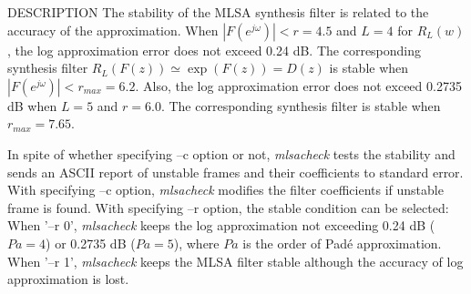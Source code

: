 \begin{qsection}{DESCRIPTION}
 The stability of the MLSA synthesis filter
 is related to the accuracy of the approximation.
 When \begin{math} |F(e^{j\omega})| < r = 4.5 \end{math} and
 \begin{math} L = 4 \end{math}
 for \begin{math} R_{L}(w)\end{math},
 the log approximation error does not exceed 0.24 dB.
 The corresponding synthesis filter
 \begin{math} R_{L}(F(z))\simeq \exp(F(z))=D(z)\end{math}
 is stable when \begin{math} |F(e^{j\omega})| < r_{max} = 6.2 \end{math}.
 Also, the log approximation error does not exceed 0.2735 dB
 when \begin{math} L = 5 \end{math} and
 \begin{math}r = 6.0 \end{math}.
 The corresponding synthesis filter is stable
 when \begin{math}r_{max} = 7.65 \end{math}.

 In spite of whether specifying --c option or not,
 {\em mlsacheck} tests the stability and sends an ASCII report of unstable frames and
 their coefficients to standard error.
 With specifying --c option,
 {\em mlsacheck} modifies the filter coefficients
 if unstable frame is found.
 With specifying --r option,
 the stable condition can be selected:
 When '--r 0', {\em mlsacheck} keeps the log approximation
 not exceeding 0.24 dB ($Pa=4$) or 0.2735 dB ($Pa=5$),
 where $Pa$ is the order of Pad\'e approximation.
 When '--r 1', {\em mlsacheck} keeps the MLSA filter stable
 although the accuracy of log approximation is lost.
\end{qsection}

\begin{options}
\end{options}

